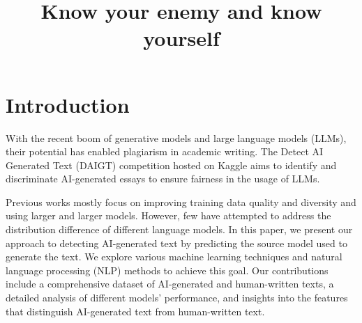 \documentclass[conference]{IEEEtran}
\begin{document}
\title{Know your enemy and know yourself}
\author{
  \and
  \and
  \and
}

\maketitle

\section{Introduction}

With the recent boom of generative models and large language models (LLMs), their potential has enabled plagiarism in academic writing. The Detect AI Generated Text (DAIGT) competition hosted on Kaggle \cite{daigt} aims to identify and discriminate AI-generated essays to ensure fairness in the usage of LLMs.

Previous works mostly focus on improving training data quality and diversity and using larger and larger models. However, few have attempted to address the distribution difference of different language models. In this paper, we present our approach to detecting AI-generated text by predicting the source model used to generate the text. We explore various machine learning techniques and natural language processing (NLP) methods to achieve this goal. Our contributions include a comprehensive dataset of AI-generated and human-written texts, a detailed analysis of different models' performance, and insights into the features that distinguish AI-generated text from human-written text.
\end{document}
